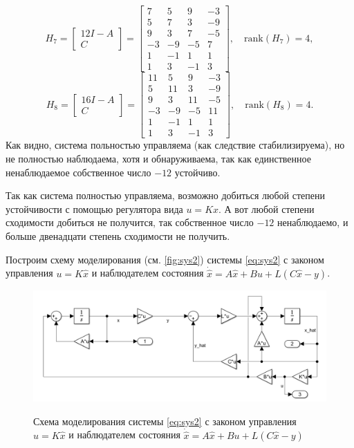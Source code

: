     \begin{equation*}
        H_7 = \begin{bmatrix}
            12 I - A \\ C
        \end{bmatrix}=\begin{bmatrix}
         7 & 5 & 9 & -3 \\
         5 & 7 & 3 & -9 \\
         9 & 3 & 7 & -5 \\
        -3 & -9 & -5 & 7 \\
         1 & -1 & 1 & 1 \\
         1 & 3 & -1 & 3
        \end{bmatrix},
        \quad\text{rank}(H_7) = 4,
    \end{equation*}
    \begin{equation*}
        H_8 = \begin{bmatrix}
            16 I - A \\ C
        \end{bmatrix}=\begin{bmatrix}
        11 & 5 & 9 & -3 \\
         5 & 11 & 3 & -9 \\
         9 & 3 & 11 & -5 \\
        -3 & -9 & -5 & 11 \\
         1 & -1 & 1 & 1 \\
         1 & 3 & -1 & 3
    \end{bmatrix},
    \quad\text{rank}(H_8) = 4.
\end{equation*}
Как видно, система польностью управляема (как следствие стабилизируема), 
но не полностью наблюдаема, хотя и обнаруживаема, так как единственное
ненаблюдаемое собственное число $-12$ устойчиво.

Так как система полностью управляема, возможно добиться любой степени
устойчивости с помощью регулятора вида $u=Kx.$ А вот любой степени сходимости
добиться не получится, так собственное число $-12$ ненаблюдаемо, и больше
двенадцати степень сходимости не получить.

Построим схему моделирования (см. \autoref{fig:sys2}) системы \eqref{eq:sys2} 
с законом управления $u=K\hat x$
и наблюдателем состояния $\dot{\hat x}=A\hat x+Bu+L(C\hat x-y)$.
\begin{figure}[H]
    \centering
    \caption{Схема моделирования системы \eqref{eq:sys2} 
    с законом управления $u=K\hat x$
    и наблюдателем состояния $\dot{\hat x}=A\hat x+Bu+L(C\hat x-y)$}
    \includegraphics[width=\textwidth]{figs/task2_slx.png}
    \label{fig:sys2}
\end{figure}

